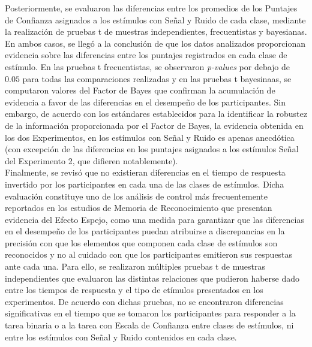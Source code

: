 \documentclass[jou,apacite]{apa6}
\begin{document}
Posteriormente, se evaluaron las diferencias entre los promedios de los Puntajes de Confianza asignados a los estímulos con Señal y Ruido de cada clase, mediante la realización de pruebas t de muestras independientes, frecuentistas y bayesianas. En ambos casos, se llegó a la conclusión de que los datos analizados proporcionan evidencia sobre las diferencias entre los puntajes registrados en cada clase de estímulo. En las pruebas t frecuentistas, se observaron \textit{p-values} por debajo de $0.05$ para todas las comparaciones realizadas y en las pruebas t bayesinaas, se computaron valores del Factor de Bayes que confirman la acumulación de evidencia a favor de las diferencias en el desempeño de los participantes. Sin embargo, de acuerdo con los estándares establecidos para la identificar la robustez de la información proporcionada por el Factor de Bayes, la evidencia obtenida en los dos Experimentos, en los estímulos con Señal y Ruido es apenas anecdótica (con excepción de las diferencias en los puntajes asignados a los estímulos Señal del Experimento 2, que difieren notablemente).\\

Finalmente, se revisó que no existieran diferencias en el tiempo de respuesta invertido por los participantes en cada una de las clases de estímulos. Dicha evaluación constituye uno de los análisis de control más frecuentemente reportados en los estudios de Memoria de Reconocimiento que presentan evidencia del Efecto Espejo, como una medida para garantizar que las diferencias en el desempeño de los participantes puedan atribuirse a discrepancias en la precisión con que los elementos que componen cada clase de estímulos son reconocidos y no al cuidado con que los participantes emitieron sus respuestas ante cada una. Para ello, se realizaron múltiples pruebas t de muestras independientes que evaluaron las distintas relaciones que pudieron haberse dado entre los tiempos de respuesta y el tipo de etímulos presentados en los experimentos. De acuerdo con dichas pruebas, no se encontraron diferencias significativas en el tiempo que se tomaron los participantes para responder a la tarea binaria o a la tarea con Escala de Confianza entre clases de estímulos, ni entre los estímulos con Señal y Ruido contenidos en cada clase.\\ 
\end{document}
